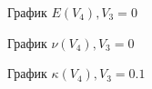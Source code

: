\documentclass[12pt,a4paper]{article}
\begin{document}
    \begin{figure}[h]
        \caption{График $E(V_4), V_3 = 0$}
    \end{figure}

    \pagebreak

    \begin{figure}[h]
        \caption{График $\nu(V_4), V_3 = 0$}
    \end{figure}

    \begin{figure}[h]
        \caption{График $\kappa(V_4), V_3 = 0.1$}
    \end{figure}
\end{document}
